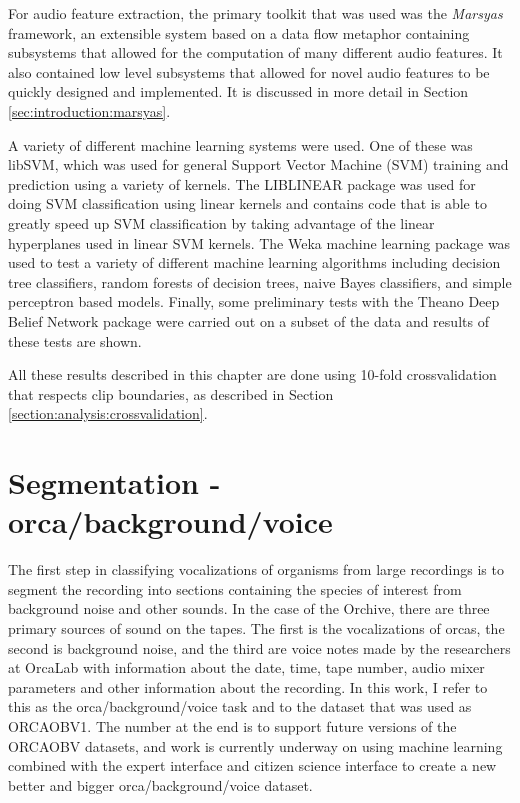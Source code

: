\documentclass[12pt,oneside]{book}
\begin{document}
For audio feature extraction, the primary toolkit that was used was
the \textit{Marsyas} \cite{tzanetakis2008marsyas} framework, an extensible
system based on a data flow metaphor containing subsystems that
allowed for the computation of many different audio features.  It also
contained low level subsystems that allowed for novel audio features
to be quickly designed and implemented.  It is discussed in more
detail in Section \ref{sec:introduction:marsyas}.

A variety of different machine learning systems were used.  One of
these was libSVM\cite{chang2001libsvm}, which was used for general
Support Vector Machine (SVM) training and prediction using a variety
of kernels.  The LIBLINEAR \cite{rongen2008liblinear} package was used
for doing SVM classification using linear kernels and contains code
that is able to greatly speed up SVM classification by taking
advantage of the linear hyperplanes used in linear SVM kernels.  The
Weka machine learning package \cite{witten2005weka} was used to test a
variety of different machine learning algorithms including decision
tree classifiers, random forests of decision trees, naive Bayes
classifiers, and simple perceptron based models.  Finally, some
preliminary tests with the Theano \cite{bergstra2010theano} Deep
Belief Network package were carried out on a subset of the data and
results of these tests are shown.

All these results described in this chapter are done using 10-fold
crossvalidation that respects clip boundaries, as described in Section
\ref{section:analysis:crossvalidation}.

\section{Segmentation - orca/background/voice}

The first step in classifying vocalizations of organisms from large
recordings is to segment the recording into sections containing the
species of interest from background noise and other sounds.  In the
case of the Orchive, there are three primary sources of sound on the
tapes.  The first is the vocalizations of orcas, the second is
background noise, and the third are voice notes made by the
researchers at OrcaLab with information about the date, time, tape
number, audio mixer parameters and other information about the
recording.  In this work, I refer to this as the
orca/background/voice task and to the dataset that was used as
ORCAOBV1.  The number at the end is to support future versions of the
ORCAOBV datasets, and work is currently underway on using machine
learning combined with the expert interface and citizen science
interface to create a new better and bigger orca/background/voice
dataset.
\end{document}
